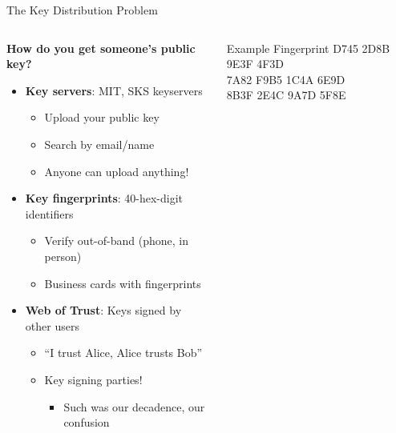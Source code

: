 \documentclass[aspectratio=169, lualatex, handout]{beamer}
\begin{document}
\begin{frame}{The Key Distribution Problem}
	\begin{columns}
		\begin{column}{0.6\textwidth}
			\textbf{How do you get someone's public key?}
			\begin{itemize}
				\item \textbf{Key servers}: MIT, SKS keyservers
				      \begin{itemize}
					      \item Upload your public key
					      \item Search by email/name
					      \item Anyone can upload anything!
				      \end{itemize}
				\item \textbf{Key fingerprints}: 40-hex-digit identifiers
				      \begin{itemize}
					      \item Verify out-of-band (phone, in person)
					      \item Business cards with fingerprints
				      \end{itemize}
				\item \textbf{Web of Trust}: Keys signed by other users
				      \begin{itemize}
					      \item ``I trust Alice, Alice trusts Bob''
					      \item Key signing parties!
					            \begin{itemize}
						            \item Such was our decadence, our confusion
					            \end{itemize}
				      \end{itemize}
			\end{itemize}
		\end{column}
		\begin{column}{0.4\textwidth}
			\begin{exampleblock}{Example Fingerprint}
				\ttfamily\scriptsize
				D745 2D8B 9E3F 4F3D\\
				7A82 F9B5 1C4A 6E9D\\
				8B3F 2E4C 9A7D 5F8E
			\end{exampleblock}
		\end{column}
	\end{columns}
\end{frame}
\end{document}
